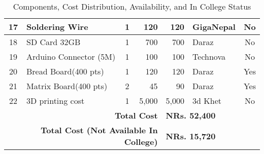 \begin{table}[h]
{\begin{tabular}{|c|p{4.6cm}|c|r|r|p{3cm}|c|}
17 & Soldering Wire & 1 & 120 & 120 & GigaNepal & No \\\hline
18 & SD Card 32GB & 1 & 700 & 700 & Daraz & No \\\hline
19 & Arduino Connector (5M) & 1 & 100 & 100 & Technova & No \\\hline
20 & Bread Board(400 pts) & 1 & 120 & 120 & Daraz & Yes \\\hline
21 & Matrix Board(400 pts) & 2 & 45  & 90 & Daraz & Yes \\\hline
22 & 3D printing cost & 1 & 5,000  & 5,000 & 3d Khet & No \\
\hline
\multicolumn{4}{|r|}{\textbf{Total Cost}} & \multicolumn{3}{l|}{\textbf{NRs. 52,400}} \\
\hline
\multicolumn{4}{|r|}{\textbf{Total Cost (Not Available In College)}} & \multicolumn{3}{l|}{\textbf{NRs. 15,720}} \\
\hline
\end{tabular}
}
\caption{Components, Cost Distribution, Availability, and In College Status}
\end{table}
